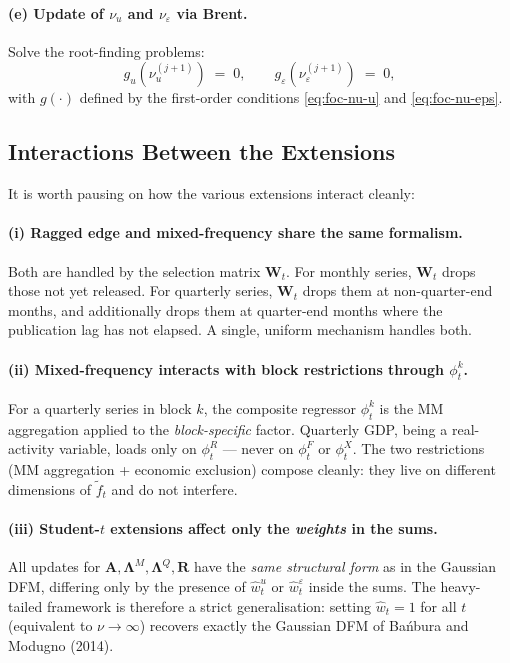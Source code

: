 \documentclass[11pt, a4paper, oneside]{article}
\newcommand{\mL}{\boldsymbol{\Lambda}}
\begin{document}
\paragraph{(e) Update of $\nu_u$ and $\nu_\varepsilon$ via Brent.}
Solve the root-finding problems:
\[
g_u(\nu_u^{(j+1)}) \;=\; 0,
\qquad
g_\varepsilon(\nu_\varepsilon^{(j+1)}) \;=\; 0,
\]
with $g(\cdot)$ defined by the first-order conditions
\eqref{eq:foc-nu-u} and \eqref{eq:foc-nu-eps}.

\subsection{Interactions Between the Extensions}
\label{subsec:full-interactions}

It is worth pausing on how the various extensions interact cleanly:

\paragraph{(i) Ragged edge and mixed-frequency share the same formalism.}
Both are handled by the selection matrix $\mathbf{W}_t$. For monthly
series, $\mathbf{W}_t$ drops those not yet released. For quarterly
series, $\mathbf{W}_t$ drops them at non-quarter-end months, and
additionally drops them at quarter-end months where the publication
lag has not elapsed. A single, uniform mechanism handles both.

\paragraph{(ii) Mixed-frequency interacts with block restrictions through $\phi^k_t$.}
For a quarterly series in block $k$, the composite regressor
$\phi^k_t$ is the MM aggregation applied to the \emph{block-specific}
factor. Quarterly GDP, being a real-activity variable, loads only on
$\phi^R_t$ — never on $\phi^F_t$ or $\phi^X_t$. The two restrictions
(MM aggregation + economic exclusion) compose cleanly: they live on
different dimensions of $\tilde{f}_t$ and do not interfere.

\paragraph{(iii) Student-$t$ extensions affect only the \emph{weights} in the sums.}
All updates for $\mathbf{A}, \mL^M, \mL^Q, \mathbf{R}$
have the \emph{same structural form} as in the Gaussian DFM, differing
only by the presence of $\hat{w}^u_t$ or $\hat{w}^\varepsilon_t$
inside the sums. The heavy-tailed framework is therefore a strict
generalisation: setting $\hat{w}_t = 1$ for all $t$ (equivalent to
$\nu \to \infty$) recovers exactly the Gaussian DFM of Bańbura and
Modugno (2014).
\end{document}
